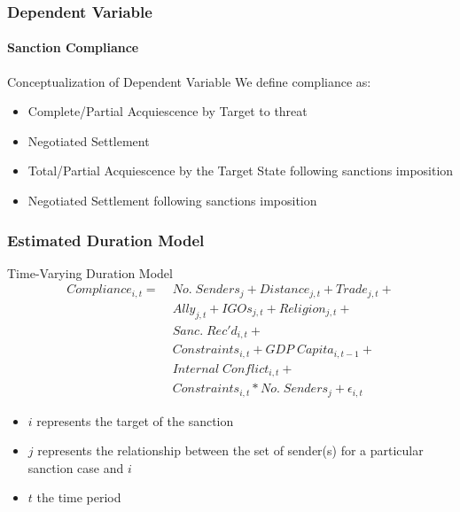 \begin{frame}
\frametitle{Dependent Variable}
\framesubtitle{Sanction Compliance}

\begin{block}{Conceptualization of Dependent Variable}
	We define compliance as:
	\begin{itemize}
		\item Complete/Partial Acquiescence by Target to threat
		\item Negotiated Settlement
		\item Total/Partial Acquiescence by the Target State following sanctions imposition
		\item Negotiated Settlement following sanctions imposition
	\end{itemize}
\end{block}

\end{frame}

\begin{frame}
\frametitle{Estimated Duration Model}

\begin{block}{Time-Varying Duration Model}
	\begin{align*}
		Compliance_{i,t} =\; & No. \; Senders_{j} + Distance_{j,t} + Trade_{j,t}  + \\
		 &Ally_{j,t} + IGOs_{j,t} + Religion_{j,t} +\\
 		 &Sanc. \; Rec'd_{i,t} + \\
		 &Constraints_{i,t} + GDP \; Capita_{i,t-1} +\\
		 & Internal \; Conflict_{i,t} +\\
		 &Constraints_{i,t}*No. \; Senders_{j} + \epsilon_{i,t}
	\end{align*}
\end{block}

\begin{itemize}
	\item $i$ represents the target of the sanction
	\item $j$ represents the relationship between the set of sender(s) for a particular sanction case and $i$
	\item $t$ the time period
\end{itemize}

\end{frame}

